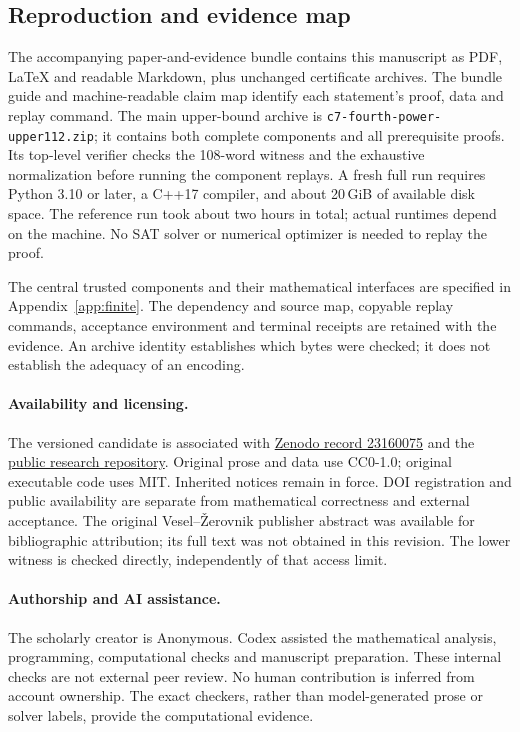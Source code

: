\documentclass[11pt]{article}
\theoremstyle{definition}
\begin{document}
\subsection{Reproduction and evidence map}
The accompanying paper-and-evidence bundle contains this manuscript as PDF,
LaTeX and readable Markdown, plus unchanged certificate archives. The
bundle guide and machine-readable claim map identify each statement's proof,
data and replay command. The main upper-bound archive
is \nolinkurl{c7-fourth-power-upper112.zip}; it contains both complete components
and all prerequisite proofs. Its top-level verifier checks
the 108-word witness and the exhaustive normalization before running the
component replays. A fresh full run requires Python 3.10 or later,
a C++17 compiler, and about 20\,GiB of available disk space. The reference
run took about two hours in total; actual runtimes depend on the machine.
No SAT solver or numerical optimizer is needed to replay the proof.

The central trusted components and their mathematical interfaces are
specified in Appendix~\ref{app:finite}. The dependency and source map,
copyable replay commands, acceptance environment and terminal receipts
are retained with the evidence. An archive identity establishes which
bytes were checked; it does not establish the adequacy of an encoding.

\paragraph{Availability and licensing.}
The versioned candidate is associated with
\href{https://doi.org/10.5281/zenodo.23160075}{Zenodo record 23160075}
and the \href{https://github.com/ipitchford/seven-cycle-fourth-power-upper112}{public research repository}.
Original prose and data use CC0-1.0; original executable code uses MIT.
Inherited notices remain in force. DOI registration and public availability
are separate from mathematical correctness and external acceptance.
The original Vesel--\v{Z}erovnik publisher abstract was available for
bibliographic attribution; its full text was not obtained in this revision.
The lower witness is checked directly, independently of that access limit.

\paragraph{Authorship and AI assistance.}
The scholarly creator is Anonymous. Codex assisted the mathematical analysis,
programming, computational checks and manuscript preparation. These internal
checks are not external peer review. No human contribution is inferred from
account ownership. The exact checkers, rather than model-generated prose or
solver labels, provide the computational evidence.
\end{document}
